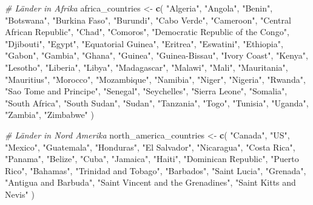 \documentclass[
]{article}
\newenvironment{Shaded}{\begin{snugshade}}{\end{snugshade}}
\newcommand{\CommentTok}[1]{\textcolor[rgb]{0.56,0.35,0.01}{\textit{#1}}}
\newcommand{\FunctionTok}[1]{\textcolor[rgb]{0.13,0.29,0.53}{\textbf{#1}}}
\newcommand{\NormalTok}[1]{#1}
\newcommand{\OtherTok}[1]{\textcolor[rgb]{0.56,0.35,0.01}{#1}}
\newcommand{\StringTok}[1]{\textcolor[rgb]{0.31,0.60,0.02}{#1}}
\begin{document}
\begin{Shaded}
\begin{Highlighting}[]
\CommentTok{\# Länder in Afrika}
\NormalTok{africa\_countries }\OtherTok{\textless{}{-}} \FunctionTok{c}\NormalTok{(}
  \StringTok{"Algeria"}\NormalTok{, }\StringTok{"Angola"}\NormalTok{, }\StringTok{"Benin"}\NormalTok{, }\StringTok{"Botswana"}\NormalTok{, }\StringTok{"Burkina Faso"}\NormalTok{, }\StringTok{"Burundi"}\NormalTok{, }
  \StringTok{"Cabo Verde"}\NormalTok{, }\StringTok{"Cameroon"}\NormalTok{, }\StringTok{"Central African Republic"}\NormalTok{, }\StringTok{"Chad"}\NormalTok{, }
  \StringTok{"Comoros"}\NormalTok{, }\StringTok{"Democratic Republic of the Congo"}\NormalTok{, }\StringTok{"Djibouti"}\NormalTok{, }\StringTok{"Egypt"}\NormalTok{, }
  \StringTok{"Equatorial Guinea"}\NormalTok{, }\StringTok{"Eritrea"}\NormalTok{, }\StringTok{"Eswatini"}\NormalTok{, }\StringTok{"Ethiopia"}\NormalTok{, }\StringTok{"Gabon"}\NormalTok{, }
  \StringTok{"Gambia"}\NormalTok{, }\StringTok{"Ghana"}\NormalTok{, }\StringTok{"Guinea"}\NormalTok{, }\StringTok{"Guinea{-}Bissau"}\NormalTok{, }\StringTok{"Ivory Coast"}\NormalTok{, }
  \StringTok{"Kenya"}\NormalTok{, }\StringTok{"Lesotho"}\NormalTok{, }\StringTok{"Liberia"}\NormalTok{, }\StringTok{"Libya"}\NormalTok{, }\StringTok{"Madagascar"}\NormalTok{, }\StringTok{"Malawi"}\NormalTok{, }
  \StringTok{"Mali"}\NormalTok{, }\StringTok{"Mauritania"}\NormalTok{, }\StringTok{"Mauritius"}\NormalTok{, }\StringTok{"Morocco"}\NormalTok{, }\StringTok{"Mozambique"}\NormalTok{, }
  \StringTok{"Namibia"}\NormalTok{, }\StringTok{"Niger"}\NormalTok{, }\StringTok{"Nigeria"}\NormalTok{, }\StringTok{"Rwanda"}\NormalTok{, }\StringTok{"Sao Tome and Principe"}\NormalTok{, }
  \StringTok{"Senegal"}\NormalTok{, }\StringTok{"Seychelles"}\NormalTok{, }\StringTok{"Sierra Leone"}\NormalTok{, }\StringTok{"Somalia"}\NormalTok{, }\StringTok{"South Africa"}\NormalTok{, }
  \StringTok{"South Sudan"}\NormalTok{, }\StringTok{"Sudan"}\NormalTok{, }\StringTok{"Tanzania"}\NormalTok{, }\StringTok{"Togo"}\NormalTok{, }\StringTok{"Tunisia"}\NormalTok{, }\StringTok{"Uganda"}\NormalTok{, }
  \StringTok{"Zambia"}\NormalTok{, }\StringTok{"Zimbabwe"}
\NormalTok{)}

\CommentTok{\# Länder in Nord Amerika}
\NormalTok{north\_america\_countries }\OtherTok{\textless{}{-}} \FunctionTok{c}\NormalTok{(}
  \StringTok{"Canada"}\NormalTok{, }\StringTok{"US"}\NormalTok{, }\StringTok{"Mexico"}\NormalTok{, }\StringTok{"Guatemala"}\NormalTok{, }\StringTok{"Honduras"}\NormalTok{, }
  \StringTok{"El Salvador"}\NormalTok{, }\StringTok{"Nicaragua"}\NormalTok{, }\StringTok{"Costa Rica"}\NormalTok{, }\StringTok{"Panama"}\NormalTok{, }\StringTok{"Belize"}\NormalTok{, }
  \StringTok{"Cuba"}\NormalTok{, }\StringTok{"Jamaica"}\NormalTok{, }\StringTok{"Haiti"}\NormalTok{, }\StringTok{"Dominican Republic"}\NormalTok{, }\StringTok{"Puerto Rico"}\NormalTok{, }
  \StringTok{"Bahamas"}\NormalTok{, }\StringTok{"Trinidad and Tobago"}\NormalTok{, }\StringTok{"Barbados"}\NormalTok{, }\StringTok{"Saint Lucia"}\NormalTok{, }
  \StringTok{"Grenada"}\NormalTok{, }\StringTok{"Antigua and Barbuda"}\NormalTok{, }\StringTok{"Saint Vincent and the Grenadines"}\NormalTok{, }
  \StringTok{"Saint Kitts and Nevis"}
\NormalTok{)}


\end{Highlighting}
\end{Shaded}
\end{document}
